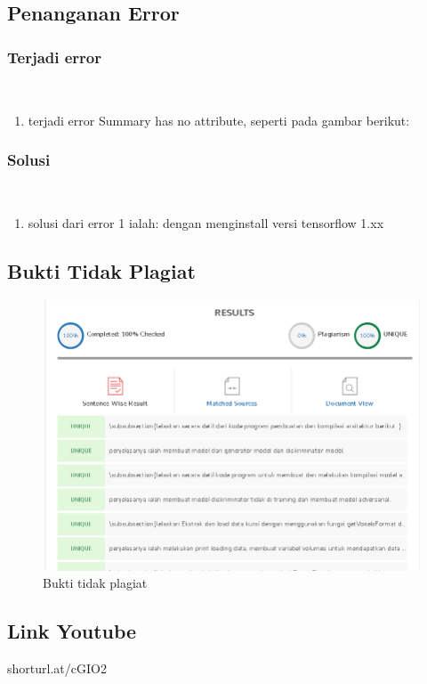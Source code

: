 \subsection{Penanganan Error}
\subsubsection{Terjadi error}
\hfill\\
\begin{enumerate}
\item terjadi error Summary has no attribute, seperti pada gambar berikut:
\end{enumerate}

\subsubsection{Solusi}
\hfill\\
\begin{enumerate}
\item solusi dari error 1 ialah:
dengan menginstall versi tensorflow 1.xx

\end{enumerate}

\subsection{Bukti Tidak Plagiat}
\begin{figure}[H]
	\centering
	\includegraphics[width=12cm]{figures/1174079/8/plagiat.png}
	\caption{Bukti tidak plagiat}
\end{figure}

\subsection{Link Youtube}
shorturl.at/cGIO2